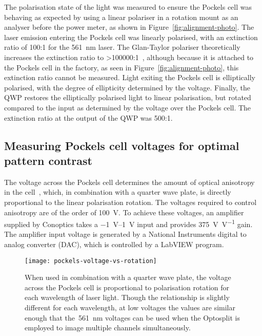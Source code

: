 The polarisation state of the light was measured to ensure the Pockels cell was behaving as expected by using a linear polariser in a rotation mount as an analyser before the power meter, as shown in Figure~\ref{fig:alignment-photo}.
The laser emission entering the Pockels cell was linearly polarised, with an extinction ratio of 100:1 for the \SI{561}{\nano\metre} laser.
The Glan-Taylor polariser theoretically increases the extinction ratio to >\num{100000}:1~\cite{bennett1995handbook}, although because it is attached to the Pockels cell in the factory, as seen in Figure~\ref{fig:alignment-photo}, this extinction ratio cannot be measured.
Light exiting the Pockels cell is elliptically polarised, with the degree of ellipticity determined by the voltage.
Finally, the QWP restores the elliptically polarised light to linear polarisation, but rotated compared to the input as determined by the voltage over the Pockels cell.
The extinction ratio at the output of the QWP was 500:1.

\subsection{Measuring Pockels cell voltages for optimal pattern contrast}
The voltage across the Pockels cell determines the amount of optical anisotropy in the cell~\cite[\textit{ch. 8}]{hecht2017optics}, which, in combination with a quarter wave plate, is directly proportional to the linear polarisation rotation.
The voltages required to control anisotropy are of the order of \SI{100}{\volt}.
To achieve these voltages, an amplifier supplied by Conoptics takes a \SIrange{-1}{1}{\volt} input and provides \SI[per-mode=symbol]{375}{\volt\per\volt} gain.
The amplifier input voltage is generated by a National Instruments digital to analog converter (DAC), which is controlled by a LabVIEW program.

\begin{figure}[b!]
\centering
\texttt{[image: pockels-voltage-vs-rotation]}
\caption[LAG SIM: A Pockels cell is used to rotate the polarisation of laser light for maximum SIM pattern contrast]{When used in combination with a quarter wave plate, the voltage across the Pockels cell is proportional to polarisation rotation for each wavelength of laser light. Though the relationship is slightly different for each wavelength, at low voltages the values are similar enough that the~\SI{561}{\nano\metre} voltages can be used when the Optosplit is employed to image multiple channels simultaneously.}
\label{fig:pockels-voltage-rotation}
\end{figure}

